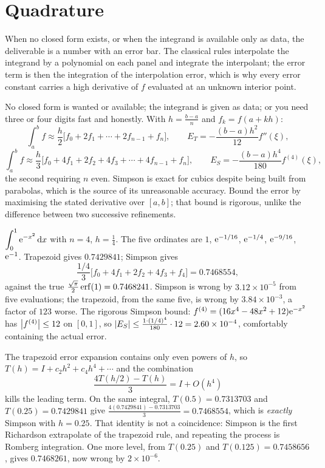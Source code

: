 \section{Quadrature}

When no closed form exists, or when the integrand is available only as data, the deliverable is a number with an error bar. The classical rules interpolate the integrand by a polynomial on each panel and integrate the interpolant; the error term is then the integration of the interpolation error, which is why every error constant carries a high derivative of $f$ evaluated at an unknown interior point.

\cue No closed form is wanted or available; the integrand is given as data; or you need three or four digits fast and honestly.
\method With $h=\tfrac{b-a}{n}$ and $f_{k}=f(a+kh)$:
\[\int_a^bf\approx\frac{h}{2}\bigl[f_{0}+2f_{1}+\cdots+2f_{n-1}+f_{n}\bigr],\qquad E_{T}=-\frac{(b-a)h^{2}}{12}f''(\xi),\]
\[\int_a^bf\approx\frac{h}{3}\bigl[f_{0}+4f_{1}+2f_{2}+4f_{3}+\cdots+4f_{n-1}+f_{n}\bigr],\qquad E_{S}=-\frac{(b-a)h^{4}}{180}f^{(4)}(\xi),\]
the second requiring $n$ even. Simpson is exact for cubics despite being built from parabolas, which is the source of its unreasonable accuracy. Bound the error by maximising the stated derivative over $[a,b]$; that bound is rigorous, unlike the difference between two successive refinements.

\begin{worked}
$\displaystyle\int_0^{1}\mathrm{e}^{-x^{2}}\,\mathrm{d} x$ with $n=4$, $h=\tfrac14$. The five ordinates are $1$, $\mathrm{e}^{-1/16}$, $\mathrm{e}^{-1/4}$, $\mathrm{e}^{-9/16}$, $\mathrm{e}^{-1}$. Trapezoid gives $0.7429841$; Simpson gives
\[\frac{1/4}{3}\bigl[f_{0}+4f_{1}+2f_{2}+4f_{3}+f_{4}\bigr]=0.7468554,\]
against the true $\tfrac{\sqrt\pi}{2}\operatorname{erf}(1)=0.7468241$. Simpson is wrong by $3.12\times10^{-5}$ from five evaluations; the trapezoid, from the same five, is wrong by $3.84\times10^{-3}$, a factor of $123$ worse. The rigorous Simpson bound: $f^{(4)}=(16x^{4}-48x^{2}+12)\mathrm{e}^{-x^{2}}$ has $\left\lvert f^{(4)}\right\rvert\leq12$ on $[0,1]$, so $\left\lvert E_{S}\right\rvert\leq\tfrac{1\cdot(1/4)^{4}}{180}\cdot12=2.60\times10^{-4}$, comfortably containing the actual error.
\end{worked}

\begin{worked}
The trapezoid error expansion contains only even powers of $h$, so $T(h)=I+c_{2}h^{2}+c_{4}h^{4}+\cdots$ and the combination
\[\frac{4T(h/2)-T(h)}{3}=I+O(h^{4})\]
kills the leading term. On the same integral, $T(0.5)=0.7313703$ and $T(0.25)=0.7429841$ give $\tfrac{4(0.7429841)-0.7313703}{3}=0.7468554$, which is \emph{exactly} Simpson with $h=0.25$. That identity is not a coincidence: Simpson is the first Richardson extrapolate of the trapezoid rule, and repeating the process is Romberg integration. One more level, from $T(0.25)$ and $T(0.125)=0.7458656$, gives $0.7468261$, now wrong by $2\times10^{-6}$.
\end{worked}

